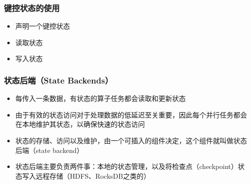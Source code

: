 \documentclass{beamer}
\begin{document}
  \begin{frame}
      \frametitle{键控状态的使用}
  
      \begin{itemize}
          \item 声明一个键控状态
          \item 读取状态
          \item 写入状态
      \end{itemize}
  
  \end{frame}

  \begin{frame}
      \frametitle{状态后端（State Backends）}
  
      \begin{itemize}
          \item 每传入一条数据，有状态的算子任务都会读取和更新状态
          \item 由于有效的状态访问对于处理数据的低延迟至关重要，因此每个并行任务都会在本地维护其状态，以确保快速的状态访问
          \item 状态的存储、访问以及维护，由一个可插入的组件决定，这个组件就叫做状态后端（state backend）
          \item 状态后端主要负责两件事：本地的状态管理，以及将检查点（checkpoint）状态写入远程存储（HDFS、RocksDB之类的）
      \end{itemize}
  
  \end{frame}
\end{document}
